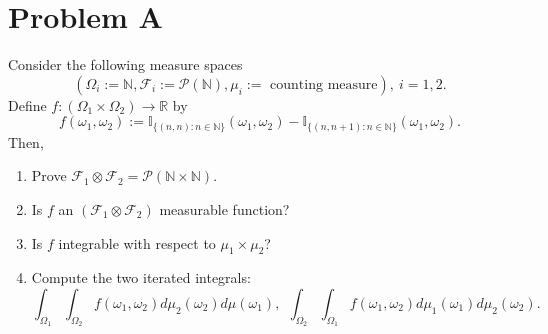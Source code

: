 \documentclass[12pt]{article}
\begin{document}
\section*{Problem A}
Consider the following measure spaces
\[ (\Omega_{i} := \mathbb{N}, \mathcal{F}_{i} := \mathcal{P}(\mathbb{N}), \mu_{i} := \text{ counting measure}),\  i = 1, 2. \]
Define $f : (\Omega_{1} \times \Omega_{2}) \rightarrow \mathbb{R}$ by 
\[ f(\omega_{1}, \omega_{2}) := \mathbb{I}_{\{(n,n) : n\in \mathbb{N}\}}(\omega_{1}, \omega_{2}) - \mathbb{I}_{\{(n,n+1) : n \in
\mathbb{N}\}}(\omega_{1}, \omega_{2}). \]
Then,
\begin{enumerate}[label=(\roman*)]
\item Prove $\mathcal{F}_{1} \otimes \mathcal{F}_{2} = \mathcal{P}(\mathbb{N} \times \mathbb{N})$.
\item Is $f$ an $(\mathcal{F}_{1} \otimes \mathcal{F}_{2})$ measurable function?
\item Is $f$ integrable with respect to $\mu_{1} \times \mu_{2}$?
\item Compute the two iterated integrals:
\[ \int_{\Omega_{1}}\int_{\Omega_{2}}f(\omega_{1},\omega_{2})d\mu_{2}(\omega_{2})d\mu(\omega_{1}),\ \ 
\int_{\Omega_{2}}\int_{\Omega_{1}}f(\omega_{1},\omega_{2})d\mu_{1}(\omega_{1})d\mu_{2}(\omega_{2}). \]
\end{enumerate}
\end{document}
